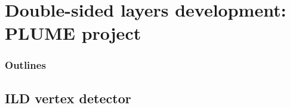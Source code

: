 \documentclass{beamer}
\begin{document}

\section{Double-sided layers development: PLUME project}
\begin{frame}
  \frametitle{Outlines}
  \begin{minipage}{\textwidth}
    \tableofcontents[currentsection,hideothersubsections, 
    sectionstyle=show/shaded]
  \end{minipage}
\end{frame}

  \subsection{ILD vertex detector}
\end{document}

